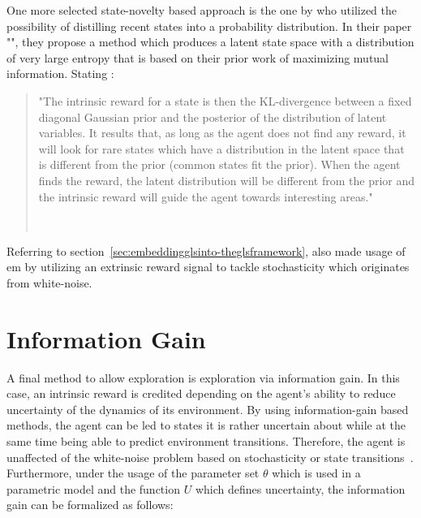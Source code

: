 \documentclass[draft,final]{vutinfth} %
\newcommand{\p}[1]{see p. #1}
\begin{document}
    One more selected state-novelty based approach is the one by \citeauthor{kim_curiosity-bottleneck_2019-1} who utilized the possibility of distilling recent states into a probability distribution.
    In their paper "", they propose a method which produces a latent state space with a distribution of very large entropy that is based on their prior work of maximizing mutual information.
    Stating \citeauthor{aubret_survey_2019}:

    \begin{quote}
        "The intrinsic reward for a state is then the KL-divergence between a fixed diagonal Gaussian prior and the posterior of the distribution of latent variables.
        It results that, as long as the agent does not find any reward, it will look for rare states which have a distribution in the latent space that is different from the prior (common states fit the prior).
        When the agent finds the reward, the latent distribution will be different from the prior and the intrinsic reward will guide the agent towards interesting areas."

        \hfill~\cite[\p{12}]{aubret_survey_2019}
    \end{quote}

    Referring to section~\ref{sec:embeddingglsinto-theglsframework}, \citeauthor{kim_curiosity-bottleneck_2019-1} also made usage of \gls{em} by utilizing an extrinsic reward signal to tackle stochasticity which originates from white-noise.


    \section{Information Gain}\label{sec:information-gain}

    A final method to allow exploration is exploration via information gain.
    In this case, an intrinsic reward is credited depending on the agent's ability to reduce uncertainty of the dynamics of its environment.
    By using information-gain based methods, the agent can be led to states it is rather uncertain about while at the same time being able to predict environment transitions.
    Therefore, the agent is unaffected of the white-noise problem based on stochasticity or state transitions~\citep{aubret_survey_2019}.
    Furthermore, under the usage of the parameter set $\theta$ which is used in a parametric model and the function $U$ which defines uncertainty, the information gain can be formalized as follows:
\end{document}
